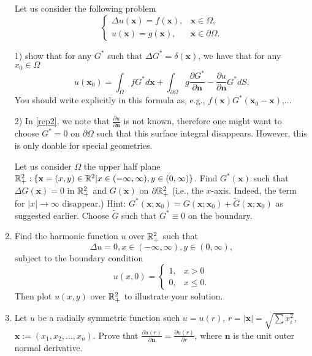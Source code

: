 \documentclass[6pt]{article}
\numberwithin{equation}{section}
\def\mathbb{\Bbb}
\begin{document}
\begin{enumerate}
Let us consider the following problem
\[
\left\{
\begin{array}{ll}
\Delta u(\textbf{x})=f(\textbf{x}),& \textbf{x}\in\Omega,\\
u(\textbf{x})=g(\textbf{x}),&\textbf{x}\in\partial \Omega.
\end{array}
\right.
\]

1) show that for any $G^*$ such that $\Delta G^*=\delta(\textbf{x})$, we have that for any $x_0\in\Omega$
\begin{equation}\label{rep2}
    u(\textbf{x}_0)=\int_\Omega fG^*d\textbf{x}+\int_{\partial \Omega}g\frac{\partial G^*}{\partial \textbf{n}}-\frac{\partial u}{\partial \textbf{n}}G^*dS.
\end{equation}
You should write explicitly in this formula as, e.g., $f(\textbf{x})G^*(\textbf{x}_0-\textbf{x})$,...

2) In \eqref{rep2}, we note that $\frac{\partial u}{\partial \textbf{n}}$ is not known, therefore one might want to choose $G^*=0$ on $\partial \Omega$ such that this surface integral disappears.  However, this is only doable for special geometries.

Let us consider $\Omega$ the upper half plane $\mathbb R^2_+:\{\textbf{x}=(x,y)\in\mathbb R^2|x\in(-\infty,\infty),y\in(0,\infty)\}$.  Find $G^*(\textbf{x})$ such that $\Delta G(\textbf{x})=0$ in $\mathbb R^2_+$ and $G(\textbf{x})$ on $\partial \mathbb R^2_+$ (i.e., the $x$-axis.  Indeed, the term for $|x|\rightarrow \infty$ disappear.)  Hint:  $G^*(\textbf{x};\textbf{x}_0)=G(\textbf{x};\textbf{x}_0)+\tilde{G}(\textbf{x};\textbf{x}_0)$ as suggested earlier.  Choose $\tilde{G}$ such that $G^*\equiv 0$ on the boundary.


\item Find the harmonic function $u$ over $\mathbb R^2_+$ such that
\[\Delta u=0, x\in(-\infty,\infty),y\in(0,\infty),\]
subject to the boundary condition
\[u(x,0)=
\left\{
\begin{array}{ll}
1,& x>0\\0,&x\leq 0.
\end{array}
\right.
\]
Then plot $u(x,y)$ over $\mathbb R^2_+$ to illustrate your solution.

\item Let $u$ be a radially symmetric function such $u=u(r)$, $r=|\textbf{x}|=\sqrt{\sum x_i^2}$, $\textbf{x}:=(x_1,x_2,\ldots,x_n)$.  Prove that $\frac{\partial u(r)}{\partial \textbf{n}}=\frac{\partial u(r)}{\partial r}$, where $\textbf{n}$ is the unit outer normal derivative.



\end{enumerate}
\end{document}
